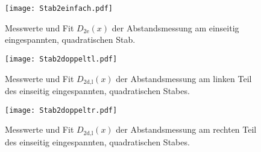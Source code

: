 \begin{figure}
  \centering
  \texttt{[image: Stab2einfach.pdf]}
  \caption{Messwerte und Fit $D_\text{2e}(x)$ der Abstandsmessung am einseitig
  eingespannten, quadratischen Stab.}
  \label{fig:Stab2einfach}
\end{figure}

\begin{figure}
  \centering
  \texttt{[image: Stab2doppeltl.pdf]}
  \caption{Messwerte und Fit $D_\text{2d,l}(x)$ der Abstandsmessung am
  linken Teil des einseitig eingespannten, quadratischen Stabes.}
  \label{fig:Stab2doppeltlinks}
\end{figure}

\begin{figure}
  \centering
  \texttt{[image: Stab2doppeltr.pdf]}
  \caption{Messwerte und Fit $D_\text{2d,l}(x)$ der Abstandsmessung am
  rechten Teil des einseitig eingespannten, quadratischen Stabes.}
  \label{fig:Stab2doppeltrechts}
\end{figure}

